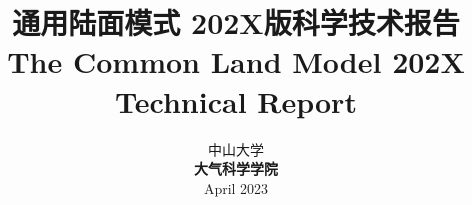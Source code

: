 \documentclass[a4paper,12pt,twoside]{report}
\begin{document}
%

\title{\huge {\bf 通用陆面模式 202X版科学技术报告}\\[3em]
\fontsize {22}{24}
\bf{ The Common Land Model 202X Technical Report }\\[3in]
\fontsize {20}{23}%
}

\author{
 \large{ 中山大学 }\\[0.1in]
 {\bf 大气科学学院}\\[1in]
 \upshape
 \large%
 April 2023
}

\normallinespacing
\maketitle

\preface

%
%
%
%

\body



















\appendix
{}


\renewcommand{\bibname}{参考文献}


\end{document}
